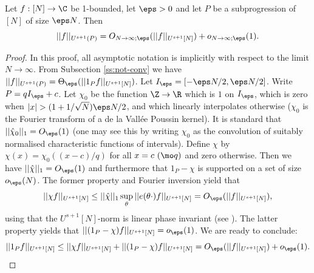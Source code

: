 \begin{prop}\label{p:gowersUniformSubprog}
Let $f:[N]\to \C$ be 1-bounded, let $\eps >0$ and let $P$ be a subprogression of $[N]$ of size $\eps N$. Then \[||f||_{U^{s+1}(P)} = O_{N \to \infty;\eps}(||f||_{U^{s+1}[N]}) + o_{N \to \infty;\eps}(1).\]
\end{prop}
\begin{proof}
In this proof, all asymptotic notation is implicitly with respect to the limit $N \to \infty$. From Subsection \ref{ss:not-conv} we have $||f||_{U^{s+1}(P)} = \Theta_\eps(||1_Pf||_{U^{s+1}[N]})$. Let $I_\eps = [-\eps N/2,\eps N/2]$. Write $P=qI_\eps+c$. Let $\chi_0$ be the function $\Z \to \R$ which is $1$ on $I_\eps$, which is zero when $|x| > (1+1/\sqrt {N})\eps N/2$, and which linearly interpolates otherwise ($\chi_0$ is the Fourier transform of a de la Vall\'ee Poussin kernel). It is standard that $||\hat \chi_0||_1 = O_\eps(1)$ (one may see this by writing $\chi_0$ as the convolution of suitably normalised characteristic functions of intervals).   
Define $\chi$ by $\chi(x) = \chi_0((x-c)/q)$ for all $x = c\ (\mo q)$ and zero otherwise. Then we have $||\hat \chi||_1 = O_\eps(1)$ and furthermore that $1_P-\chi$ is supported on a set of size $o_\eps(N)$. The former property and Fourier inversion yield that 
\[ ||\chi f||_{U^{s+1}[N]} \leq ||\hat \chi||_1\sup_\theta||e(\theta \cdot)f||_{U^{s+1}[N]} = O_\eps(||f||_{U^{s+1}[N]}),\]
using that the $U^{s+1}[N]$-norm is linear phase invariant (see \cite[Exercise 1.3.21]{T12}). The latter property yields that $||(1_P-\chi)f||_{U^{s+1}[N]} = o_\eps(1)$. We are ready to conclude: 
\[ ||1_Pf||_{U^{s+1}[N]} \leq ||\chi f||_{U^{s+1}[N]} + ||(1_P-\chi)f||_{U^{s+1}[N]} = O_{\eps}(||f||_{U^{s+1}[N]}) + o_{\eps}(1).\]
\end{proof}
